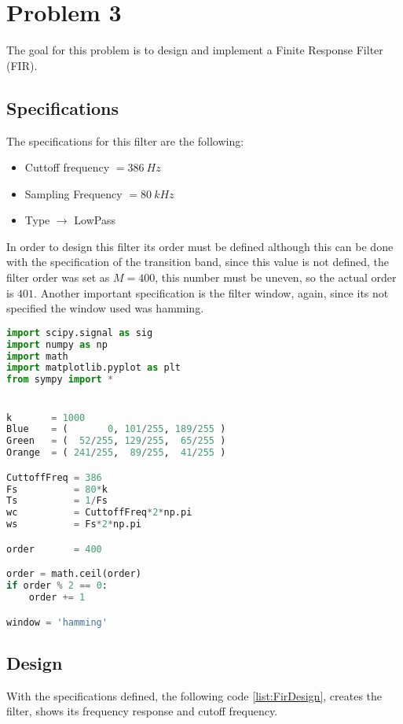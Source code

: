 \section{Problem 3}

The goal for this problem is to design and implement a Finite Response Filter (FIR).

\subsection{Specifications}

The specifications for this filter are the following:
\begin{itemize}
    \item Cuttoff frequency  $= 386~Hz$
    \item Sampling Frequency $= 80~kHz$
    \item Type $\rightarrow$ LowPass
\end{itemize}

In order to design this filter its order must be defined although this can be done with the specification of the transition band, since this value is not defined, the filter order was set as $M = 400$, this number must be uneven, so the actual order is $401$. Another important specification is the filter window, again, since its not specified the window used was hamming.
\vspace{1cm}
\begin{lstlisting}[language=python, caption = Specification Definition]
import scipy.signal as sig
import numpy as np
import math
import matplotlib.pyplot as plt 
from sympy import *


k       = 1000
Blue    = (       0, 101/255, 189/255 )
Green   = (  52/255, 129/255,  65/255 )
Orange  = ( 241/255,  89/255,  41/255 )

CuttoffFreq = 386
Fs          = 80*k
Ts          = 1/Fs
wc          = CuttoffFreq*2*np.pi
ws          = Fs*2*np.pi 

order       = 400

order = math.ceil(order)
if order % 2 == 0:
    order += 1

window = 'hamming'
\end{lstlisting}

\subsection{Design}

With the specifications defined, the following code \ref{list:FirDesign}, creates the filter, shows its frequency response and cutoff frequency.

